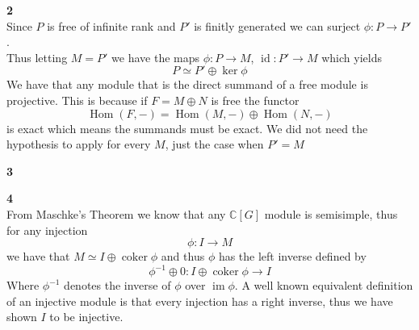 \documentclass[12pt]{article}
\newenvironment{ques}[1]{\textbf{#1}\vspace{1 mm}\\ }{\bigskip}
\theoremstyle{definition}
\DeclareMathOperator\coker{coker}
\DeclareMathOperator\im{im}
\DeclareMathOperator\id{id}
\DeclareMathOperator\Hom{Hom}
\newcommand{\C}{\mathbb C}
\renewcommand{\a}{\alpha}
\begin{document}
\begin{ques}{2}
	Since $P$ is free of infinite rank and $P'$ is finitly generated we can
	surject $\phi:P \to P'$.\\
	Thus letting $M = P'$ we have the maps $\phi:P \to M$, $\id:P' \to M$ which
	yields
	$$P \simeq P' \oplus \ker \phi$$
	We have that any module that is the direct summand of a free module is
	projective. This is because if $F = M \oplus N$ is free the functor
	$$\Hom(F,-) = \Hom(M,-) \oplus \Hom(N,-)$$
	is exact which means the summands must be exact. We did not need the
	hypothesis to apply for every $M$, just the case when $P' = M$

\end{ques}

\begin{ques}{3}
\end{ques}

\begin{ques}{4}

	From Maschke's Theorem we know that any $\C[G]$ module is semisimple, thus
	for any injection
	$$\phi: I \to M$$
	we have that $M \simeq I \oplus \coker \phi$ and thus $\phi$ has the left
	inverse defined by 
	$$\phi^{-1} \oplus 0: I \oplus \coker \phi \to I$$
	Where $\phi^{-1}$ denotes the inverse of $\phi$ over $\im \phi$. A well
	known equivalent definition of an injective module is that every injection
	has a right inverse, thus we have shown $I$ to be injective.
\end{ques}
\end{document}

